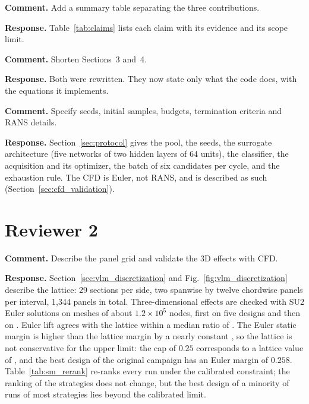 \documentclass[11pt]{article}
\newcommand{\cmt}[1]{\par\medskip\noindent\textbf{Comment.} #1}
\newcommand{\rsp}[1]{\par\noindent\textbf{Response.} #1}
\begin{document}
\cmt{Add a summary table separating the three contributions.}
\rsp{Table~\ref{tab:claims} lists each claim with its evidence and its scope limit.}

\cmt{Shorten Sections~3 and~4.}
\rsp{Both were rewritten. They now state only what the code does, with the equations it implements.}

\cmt{Specify seeds, initial samples, budgets, termination criteria and RANS details.}
\rsp{Section~\ref{sec:protocol} gives the pool, the seeds, the surrogate architecture (five networks of two hidden layers of 64 units), the classifier, the acquisition and its optimizer, the batch of six candidates per cycle, and the exhaustion rule. The CFD is Euler, not RANS, and is described as such (Section~\ref{sec:cfd_validation}).}

\section*{Reviewer 2}

\cmt{Describe the panel grid and validate the 3D effects with CFD.}
\rsp{Section~\ref{sec:vlm_discretization} and Fig.~\ref{fig:vlm_discretization} describe the lattice: 29 sections per side, two spanwise by twelve chordwise panels per interval, 1,344 panels in total. Three-dimensional effects are checked with SU2 Euler solutions on meshes of about $1.2 \times 10^5$ nodes, first on five designs and then on \NcalN. Euler lift agrees with the lattice within a median ratio of \NcalCLmed. The Euler static margin is higher than the lattice margin by a nearly constant \NcalA, so the lattice is not conservative for the upper limit: the cap of $0.25$ corresponds to a lattice value of \NcalCapEquiv, and the best design of the original campaign has an Euler margin of $0.258$. Table~\ref{tab:sm_rerank} re-ranks every run under the calibrated constraint; the ranking of the strategies does not change, but the best design of a minority of runs of most strategies lies beyond the calibrated limit.}
\end{document}
